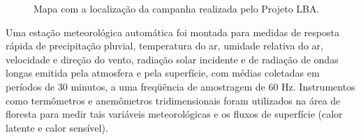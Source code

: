 \begin{figure}[ht]
	\caption{Mapa com a localização da campanha realizada pelo Projeto LBA.}
	\vspace{6mm}	%
	\begin{center}
	\end{center}
		\vspace{2mm}	%
	\legenda{}	%
	\label{rondonia}
\end{figure}

Uma estação meteorológica automática foi montada para medidas de resposta rápida de precipitação pluvial, temperatura do ar, umidade relativa do ar, velocidade e direção do vento, radiação solar incidente e de radiação de ondas longas emitida pela atmosfera e pela superfície, com médias coletadas em períodos de $30$ minutos, a uma freqüência de amostragem de $60$ Hz. Instrumentos como termômetros e anemômetros tridimensionais foram utilizados na área de floresta para medir tais variáveis meteorológicas e os fluxos de superfície (calor latente e calor sensível). 

